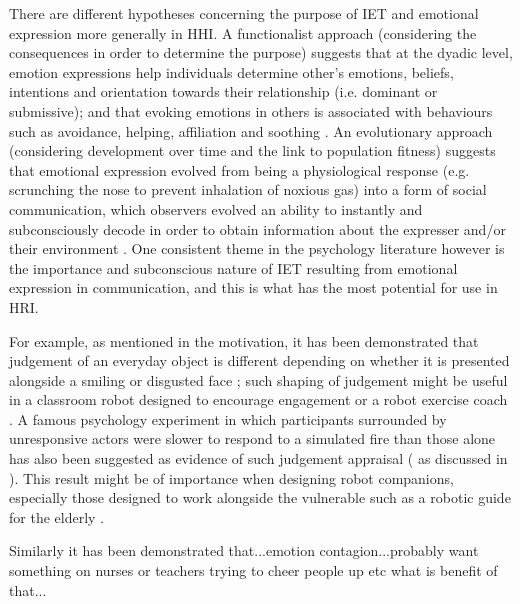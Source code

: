 \documentclass[11pt]{article}
\begin{document}
There are different hypotheses concerning the purpose of IET and emotional expression more generally in HHI. A functionalist approach (considering the consequences in order to determine the purpose) suggests that at the dyadic level, emotion expressions help individuals determine other's emotions, beliefs, intentions and orientation towards their relationship (i.e. dominant or submissive); and that evoking emotions in others is associated with behaviours such as avoidance, helping, affiliation and soothing \cite{keltner1999social}. An evolutionary approach (considering development over time and the link to population fitness) suggests that emotional expression evolved from being a physiological response (e.g. scrunching the nose to prevent inhalation of noxious gas) into a form of social communication, which observers evolved an ability to instantly and subconsciously decode in order to obtain information about the expresser and/or their environment \cite{shariff2011emotion}. One consistent theme in the psychology literature however is the importance and subconscious nature of IET resulting from emotional expression in communication, and this is what has the most potential for use in HRI. 

For example, as mentioned in the motivation, it has been demonstrated that judgement of an everyday object is different depending on whether it is presented alongside a smiling or disgusted face \cite{bayliss2007affective}; such shaping of judgement might be useful in a classroom robot designed to encourage engagement \cite{shiomi2015can} or a robot exercise coach \cite{fasola2010robot}. A famous psychology experiment in which participants surrounded by unresponsive actors were slower to respond to a simulated fire than those alone has also been suggested as evidence of such judgement appraisal (\cite{latane1968group} as discussed in \cite{parkinson2011interpersonal}). This result might be of importance when designing robot companions, especially those designed to work alongside the vulnerable such as a robotic guide for the elderly \cite{montemerlo2002experiences}.

Similarly it has been demonstrated that...emotion contagion...probably want something on nurses or teachers trying to cheer people up etc what is benefit of that...
\end{document}
